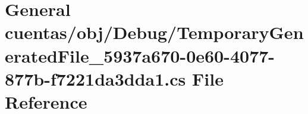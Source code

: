 \hypertarget{_general_01cuentas_2obj_2_debug_2_temporary_generated_file__5937a670-0e60-4077-877b-f7221da3dda1_8cs}{\section{General cuentas/obj/\-Debug/\-Temporary\-Generated\-File\-\_\-5937a670-\/0e60-\/4077-\/877b-\/f7221da3dda1.cs File Reference}
\label{_general_01cuentas_2obj_2_debug_2_temporary_generated_file__5937a670-0e60-4077-877b-f7221da3dda1_8cs}
}
